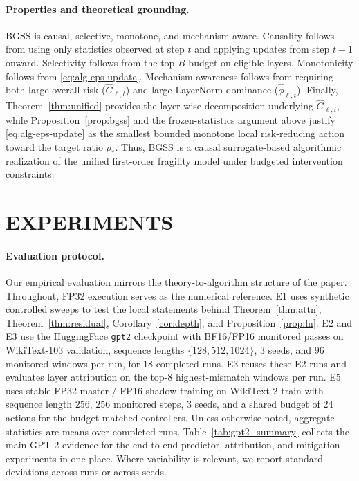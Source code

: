 \documentclass[twoside]{article}
\theoremstyle{definition}
\theoremstyle{remark}
\begin{document}
\paragraph{Properties and theoretical grounding.}
BGSS is causal, selective, monotone, and mechanism-aware. Causality follows from
using only statistics observed at step $t$ and applying updates from step $t+1$
onward. Selectivity follows from the top-$B$ budget on eligible layers. Monotonicity
follows from \eqref{eq:alg-eps-update}. Mechanism-awareness follows from requiring
both large overall risk ($\widehat{G}_{\ell,t}$) and large LayerNorm dominance
($\widehat{\phi}_{\ell,t}$). Finally, Theorem~\ref{thm:unified} provides the
layer-wise decomposition underlying $\widehat{G}_{\ell,t}$, while
Proposition~\ref{prop:bgss} and the frozen-statistics argument above justify
\eqref{eq:alg-eps-update} as the smallest bounded monotone local
risk-reducing action toward the target ratio $\rho_*$. Thus, BGSS is a causal
surrogate-based algorithmic realization of the unified first-order fragility
model under budgeted intervention constraints.

\section{EXPERIMENTS}
\label{sec:experiments}

\paragraph{Evaluation protocol.}
Our empirical evaluation mirrors the theory-to-algorithm structure of the
paper. Throughout, FP32 execution serves as the numerical reference. E1 uses
synthetic controlled sweeps to test the local statements behind
Theorem~\ref{thm:attn}, Theorem~\ref{thm:residual},
Corollary~\ref{cor:depth}, and Proposition~\ref{prop:ln}. E2 and E3 use the
HuggingFace \texttt{gpt2} checkpoint with BF16/FP16 monitored passes on
WikiText-103 validation, sequence lengths $\{128,512,1024\}$, $3$ seeds, and
$96$ monitored windows per run, for $18$ completed runs. E3 reuses these E2
runs and evaluates layer attribution on the top-$8$ highest-mismatch windows
per run. E5 uses stable FP32-master / FP16-shadow training on WikiText-2 train
with sequence length $256$, $256$ monitored steps, $3$ seeds, and a shared
budget of $24$ actions for the budget-matched controllers. Unless otherwise
noted, aggregate statistics are means over completed runs.
Table~\ref{tab:gpt2_summary} collects the main GPT-2 evidence for the
end-to-end predictor, attribution, and mitigation experiments in one place.
Where variability is relevant, we report standard deviations across runs or
across seeds.
\end{document}
